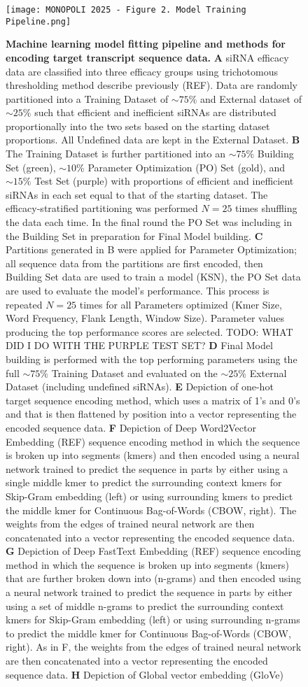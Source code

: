 \documentclass{report}
\begin{document}
\begin{figure}
    \centering
    \texttt{[image: MONOPOLI 2025 - Figure 2. Model Training Pipeline.png]}
    \caption{\textbf{Machine learning model fitting pipeline and methods for encoding target transcript sequence data.}
\textbf{A} siRNA efficacy data are classified into three efficacy groups using trichotomous thresholding method describe previously (REF). Data are randomly partitioned into a Training Dataset of $\sim75\%$ and External dataset of $\sim25\%$ such that efficient and inefficient siRNAs are distributed proportionally into the two sets based on the starting dataset proportions. All Undefined data are kept in the External Dataset. \textbf{B} The Training Dataset is further partitioned into an $\sim75\%$ Building Set (green), $\sim10\%$ Parameter Optimization (PO) Set (gold), and $\sim15\%$ Test Set (purple) with proportions of efficient and inefficient siRNAs in each set equal to that of the starting dataset. The efficacy-stratified partitioning was performed $N = 25$ times shuffling the data each time. In the final round the PO Set was including in the Building Set in preparation for Final Model building. \textbf{C} Partitions generated in B were applied for Parameter Optimization; all sequence data from the partitions are first encoded, then Building Set data are used to train a model (KSN), the PO Set data are used to evaluate the model’s performance. This process is repeated $N = 25$ times for all Parameters optimized (Kmer Size, Word Frequency, Flank Length, Window Size). Parameter values producing the top performance scores are selected. TODO: WHAT DID I DO WITH THE PURPLE TEST SET? \textbf{D} Final Model building is performed with the top performing parameters using the full $\sim75\%$ Training Dataset and evaluated on the $\sim25\%$ External Dataset (including undefined siRNAs). \textbf{E} Depiction of one-hot target sequence encoding method, which uses a matrix of 1’s and 0’s and that is then flattened by position into a vector representing the encoded sequence data. \textbf{F} Depiction of Deep Word2Vector Embedding (REF) sequence encoding method in which the sequence is broken up into segments (kmers) and then encoded using a neural network trained to predict the sequence in parts by either using a single middle kmer to predict the surrounding context kmers for Skip-Gram embedding (left) or using surrounding kmers to predict the middle kmer for Continuous Bag-of-Words (CBOW, right). The weights from the edges of trained neural network are then concatenated into a vector representing the encoded sequence data. \textbf{G} Depiction of Deep FastText Embedding  (REF) sequence encoding method in which the sequence is broken up into segments (kmers) that are further broken down into (n-grams) and then encoded using a neural network trained to predict the sequence in parts by either using a set of middle n-grams to predict the surrounding context kmers for Skip-Gram embedding (left) or using surrounding n-grams to predict the middle kmer for Continuous Bag-of-Words (CBOW, right). As in F, the weights from the edges of trained neural network are then concatenated into a vector representing the encoded sequence data. \textbf{H} Depiction of Global vector embedding (GloVe) }
\end{figure}
\end{document}
